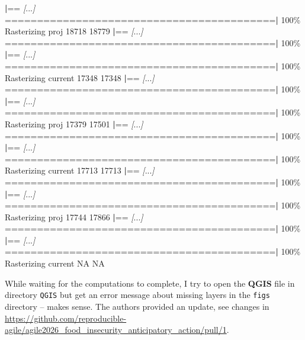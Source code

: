 \documentclass[
  a4paper,
]{article}
\newenvironment{Shaded}{\begin{snugshade}}{\end{snugshade}}
\newcommand{\ExtensionTok}[1]{#1}
\newcommand{\KeywordTok}[1]{\textcolor[rgb]{0.13,0.29,0.53}{\textbf{#1}}}
\newcommand{\NormalTok}[1]{#1}
\newcommand{\PreprocessorTok}[1]{\textcolor[rgb]{0.56,0.35,0.01}{\textit{#1}}}
\newcommand{\SpecialStringTok}[1]{\textcolor[rgb]{0.31,0.60,0.02}{#1}}
\begin{document}
\begin{Shaded}
\begin{Highlighting}[]
  \KeywordTok{|}\ExtensionTok{==} \PreprocessorTok{[}\SpecialStringTok{...}\PreprocessorTok{]}\NormalTok{ ==========================================}\KeywordTok{|} \ExtensionTok{100\%}
\ExtensionTok{Rasterizing}\NormalTok{ proj 18718 18779 }
  \KeywordTok{|}\ExtensionTok{==} \PreprocessorTok{[}\SpecialStringTok{...}\PreprocessorTok{]}\NormalTok{ ==========================================}\KeywordTok{|} \ExtensionTok{100\%}
  \KeywordTok{|}\ExtensionTok{==} \PreprocessorTok{[}\SpecialStringTok{...}\PreprocessorTok{]}\NormalTok{ ==========================================}\KeywordTok{|} \ExtensionTok{100\%}
\ExtensionTok{Rasterizing}\NormalTok{ current 17348 17348 }
  \KeywordTok{|}\ExtensionTok{==} \PreprocessorTok{[}\SpecialStringTok{...}\PreprocessorTok{]}\NormalTok{ ==========================================}\KeywordTok{|} \ExtensionTok{100\%}
  \KeywordTok{|}\ExtensionTok{==} \PreprocessorTok{[}\SpecialStringTok{...}\PreprocessorTok{]}\NormalTok{ ==========================================}\KeywordTok{|} \ExtensionTok{100\%}
\ExtensionTok{Rasterizing}\NormalTok{ proj 17379 17501 }
  \KeywordTok{|}\ExtensionTok{==} \PreprocessorTok{[}\SpecialStringTok{...}\PreprocessorTok{]}\NormalTok{ ==========================================}\KeywordTok{|} \ExtensionTok{100\%}
  \KeywordTok{|}\ExtensionTok{==} \PreprocessorTok{[}\SpecialStringTok{...}\PreprocessorTok{]}\NormalTok{ ==========================================}\KeywordTok{|} \ExtensionTok{100\%}
\ExtensionTok{Rasterizing}\NormalTok{ current 17713 17713 }
  \KeywordTok{|}\ExtensionTok{==} \PreprocessorTok{[}\SpecialStringTok{...}\PreprocessorTok{]}\NormalTok{ ==========================================}\KeywordTok{|} \ExtensionTok{100\%}
  \KeywordTok{|}\ExtensionTok{==} \PreprocessorTok{[}\SpecialStringTok{...}\PreprocessorTok{]}\NormalTok{ ==========================================}\KeywordTok{|} \ExtensionTok{100\%}
\ExtensionTok{Rasterizing}\NormalTok{ proj 17744 17866 }
  \KeywordTok{|}\ExtensionTok{==} \PreprocessorTok{[}\SpecialStringTok{...}\PreprocessorTok{]}\NormalTok{ ==========================================}\KeywordTok{|} \ExtensionTok{100\%}
  \KeywordTok{|}\ExtensionTok{==} \PreprocessorTok{[}\SpecialStringTok{...}\PreprocessorTok{]}\NormalTok{ ==========================================}\KeywordTok{|} \ExtensionTok{100\%}
\ExtensionTok{Rasterizing}\NormalTok{ current NA NA}
\end{Highlighting}
\end{Shaded}

\normalsize

While waiting for the computations to complete, I try to open the
\textbf{QGIS} file in directory \texttt{QGIS} but get an error message
about missing layers in the \texttt{figs} directory -- makes sense. The
authors provided an update, see changes in
\url{https://github.com/reproducible-agile/agile2026_food_insecurity_anticipatory_action/pull/1}.
\end{document}
